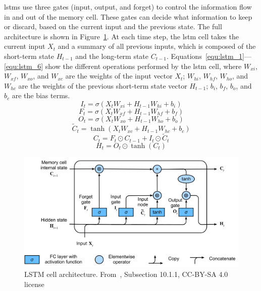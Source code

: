 \acrshort{lstm}s use three gates (input, output, and forget) to control the information flow in and out of the memory cell. These gates can decide what information to keep or discard, based on the current input and the previous state. The full architecture is shown in Figure~\ref{fig:lstm_architecture}. At each time step, the \acrshort{lstm} cell takes the current input $X_t$ and a summary of all previous inputs, which is composed of the short-term state $H_{t-1}$ and the long-term state $C_{t-1}$. Equations~\eqref{equ:lstm_1}---\eqref{equ:lstm_6} show the different operations performed by the \acrshort{lstm} cell, where $W_{xi}$, $W_{xf}$, $W_{xo}$, and $W_{xc}$ are the weights of the input vector $X_t$; $W_{hi}$, $W_{hf}$, $W_{ho}$, and $W_{hc}$ are the weights of the previous short-term state vector $H_{t-1}$; $b_i$, $b_f$, $b_o$, and $b_c$ are the bias terms.
\begin{equation}\label{equ:lstm_1}
  I_t = \sigma(X_{t}W_{xi} + H_{t-1}W_{hi} + b_{i})
\end{equation}
\begin{equation}\label{equ:lstm_2}
  F_t = \sigma(X_{t}W_{xf} + H_{t-1}W_{hf} + b_{f})
\end{equation}
\begin{equation}\label{equ:lstm_4}
  O_t = \sigma(X_{t}W_{xo} + H_{t-1}W_{ho} + b_{o})
\end{equation}
\begin{equation}\label{equ:lstm_3}
  \tilde{C}_t = \tanh(X_{t}W_{xc} + H_{t-1}W_{hc} + b_{c})
\end{equation}
\begin{equation}\label{equ:lstm_5}
  C_t = F_t \odot C_{t-1} + I_t \odot \tilde{C}_t
\end{equation}
\begin{equation}\label{equ:lstm_6}
  H_t = O_t \odot \tanh(C_t)
\end{equation}

\begin{figure}
  \centering
  \includegraphics[width=.65\linewidth]{images/modes_clustering/lstm.png}
  \caption[LSTM cell architecture]{LSTM cell architecture. From~\textcite{zhangDiveDeepLearning2023}, Subsection 10.1.1, CC-BY-SA 4.0 license}
  \label{fig:lstm_architecture}
\end{figure}


